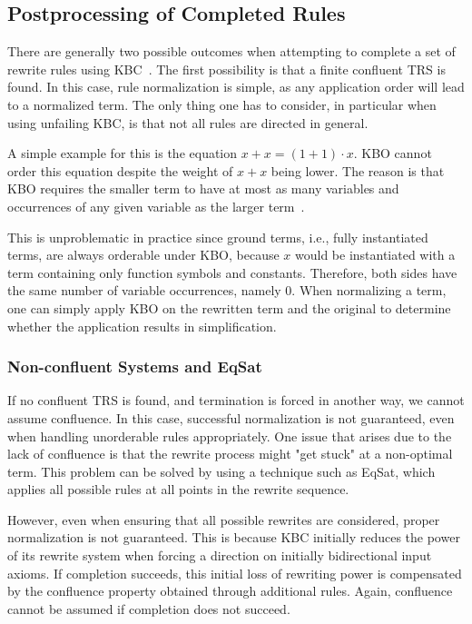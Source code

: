 \subsection{Postprocessing of Completed Rules}
\label{sec:rulegen-postprocess}
There are generally two possible outcomes when attempting to complete a set of rewrite rules using KBC~\citep{10.1093/comjnl/34.1.2}. The first possibility is that a finite confluent TRS is found. In this case, rule normalization is simple, as any application order will lead to a normalized term. The only thing one has to consider, in particular when using unfailing KBC, is that not all rules are directed in general.

A simple example for this is the equation $x+x = (1+1) \cdot x$. KBO cannot order this equation despite the weight of $x+x$ being lower. The reason is that KBO requires the smaller term to have at most as many variables and occurrences of any given variable as the larger term~\citep{BaaderNipkow1998}.

This is unproblematic in practice since ground terms, i.e., fully instantiated terms, are always orderable under KBO, because $x$ would be instantiated with a term containing only function symbols and constants. Therefore, both sides have the same number of variable occurrences, namely 0. When normalizing a term, one can simply apply KBO on the rewritten term and the original to determine whether the application results in simplification.

\subsubsection{Non-confluent Systems and EqSat}
\label{sec:non-confluence}
If no confluent TRS is found, and termination is forced in another way, we cannot assume confluence. In this case, successful normalization is not guaranteed, even when handling unorderable rules appropriately. One issue that arises due to the lack of confluence is that the rewrite process might "get stuck" at a non-optimal term. This problem can be solved by using a technique such as EqSat, which applies all possible rules at all points in the rewrite sequence.

However, even when ensuring that all possible rewrites are considered, proper normalization is not guaranteed. This is because KBC initially reduces the power of its rewrite system when forcing a direction on initially bidirectional input axioms. If completion succeeds, this initial loss of rewriting power is compensated by the confluence property obtained through additional rules. Again, confluence cannot be assumed if completion does not succeed.

